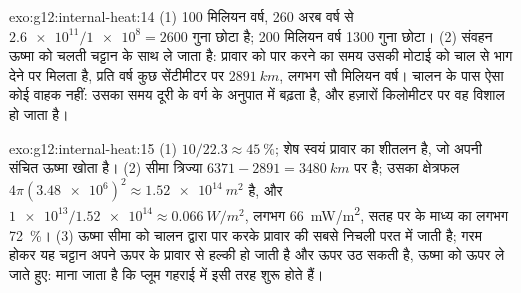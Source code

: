 \begin{solution}{exo:g12:internal-heat:14}
(1) 100 मिलियन वर्ष, 260 अरब वर्ष से $\num{2.6e11}/\num{1e8} = 2600$ गुना
छोटा है; 200 मिलियन वर्ष 1300 गुना छोटा।
(2) संवहन ऊष्मा को चलती चट्टान के साथ ले जाता है: प्रावार को पार करने का
समय उसकी मोटाई को चाल से भाग देने पर मिलता है, प्रति वर्ष कुछ सेंटीमीटर पर $\qty{2891}{km}$,
लगभग सौ मिलियन वर्ष। चालन के पास ऐसा कोई
वाहक नहीं: उसका समय दूरी के वर्ग के अनुपात में बढ़ता है, और हज़ारों
किलोमीटर पर वह विशाल हो जाता है।
\end{solution}

\begin{solution}{exo:g12:internal-heat:15}
(1) $10/22.3 \approx \qty{45}{\percent}$; शेष स्वयं प्रावार का शीतलन है,
जो अपनी संचित ऊष्मा खोता है। (2) सीमा त्रिज्या $6371 - 2891 =
\qty{3480}{km}$ पर है; उसका क्षेत्रफल $4\pi (\num{3.48e6})^2 \approx
\qty{1.52e14}{m^2}$ है, और $\num{1e13}/\num{1.52e14} \approx
\qty{0.066}{W/m^2}$, लगभग \qty{66}{mW/m^2}, सतह पर के माध्य का लगभग
\qty{72}{\percent}। (3) ऊष्मा सीमा को चालन द्वारा पार करके
प्रावार की सबसे निचली परत में जाती है; गरम होकर यह चट्टान अपने ऊपर के प्रावार से
हल्की हो जाती है और ऊपर उठ सकती है, ऊष्मा को ऊपर ले जाते हुए: माना जाता है कि
प्लूम गहराई में इसी तरह शुरू होते हैं।
\end{solution}

